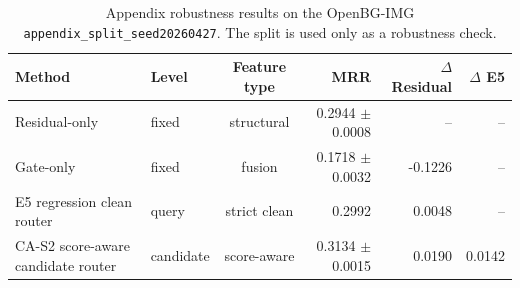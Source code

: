 \begin{table}[t]
\centering
\caption{Appendix robustness results on the OpenBG-IMG \texttt{appendix\_split\_seed20260427}. The split is used only as a robustness check.}
\label{tab:appendix_split_robustness_results}
\small
\setlength{\tabcolsep}{4pt}
\begin{tabular}{llcrrr}
\toprule
Method & Level & Feature type & MRR & $\Delta$ Residual & $\Delta$ E5 \\
\midrule
Residual-only & fixed & structural & 0.2944 $\pm$ 0.0008 & -- & -- \\
Gate-only & fixed & fusion & 0.1718 $\pm$ 0.0032 & -0.1226 & -- \\
E5 regression clean router & query & strict clean & 0.2992 & 0.0048 & -- \\
CA-S2 score-aware candidate router & candidate & score-aware & 0.3134 $\pm$ 0.0015 & 0.0190 & 0.0142 \\
\bottomrule
\end{tabular}
\end{table}
